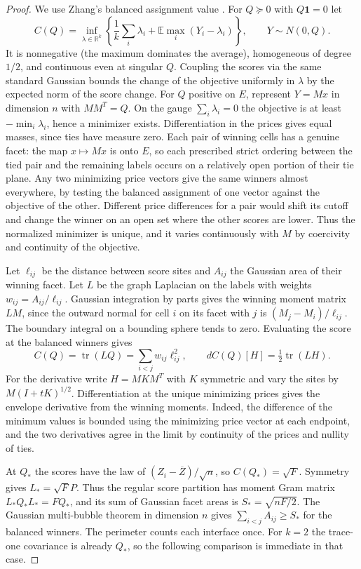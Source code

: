 \documentclass[11pt,reqno]{amsart}
\newcommand{\R}{\mathbb R}
\newcommand{\E}{\mathbb E}
\newcommand{\one}{\mathbf 1}
\DeclareMathOperator{\tr}{tr}
\begin{document}
\begin{proof}
We use Zhang's balanced assignment value \cite[Sections~2--5]{Zhang}.
For $Q\succeq0$ with $Q\one=0$ let
\[
 C(Q)=\inf_{\lambda\in\R^k}
 \left\{\frac{1}{k}\sum_i\lambda_i+
                      \E\max_i(Y_i-\lambda_i)\right\},\qquad
 Y\sim N(0,Q).
\]
It is nonnegative (the maximum dominates the average), homogeneous
of degree $1/2$, and continuous even at singular
$Q$. Coupling the scores via the same standard Gaussian bounds the
change of the objective uniformly in $\lambda$ by the expected norm
of the score change. For $Q$ positive on $E$, represent $Y=Mx$ in
dimension $n$ with $MM^T=Q$. On the gauge $\sum_i\lambda_i=0$ the
objective is at least $-\min_i\lambda_i$, hence a minimizer exists.
Differentiation in the prices gives equal masses, since ties have
measure zero. Each pair of winning cells has a genuine facet:
the map $x\mapsto Mx$ is onto $E$, so each prescribed strict ordering
between the tied pair and the remaining labels occurs on a relatively
open portion of their tie plane. Any two minimizing price vectors
give the same winners almost everywhere, by testing the balanced
assignment of one vector against the objective of the other. Different
price differences for a pair would shift its cutoff and change the
winner on an open set where the other scores are lower. Thus the
normalized minimizer is unique, and it varies continuously with $M$
by coercivity and continuity of the objective.

Let $\ell_{ij}$ be the distance between score sites and $A_{ij}$ the
Gaussian area of their winning facet. Let $L$ be the graph Laplacian
on the labels with weights $w_{ij}=A_{ij}/\ell_{ij}$. Gaussian
integration by parts gives the winning moment matrix $LM$, since the
outward normal for cell $i$ on its facet with $j$ is
$(M_j-M_i)/\ell_{ij}$. The boundary integral on a bounding sphere
tends to zero. Evaluating the score at the balanced winners gives
\[
 C(Q)=\tr(LQ)=\sum_{i<j}w_{ij}\ell_{ij}^2,\qquad
 dC(Q)[H]=\tfrac12\tr(LH).
\]
For the derivative write $H=MKM^T$ with $K$ symmetric and vary the
sites by $M(I+tK)^{1/2}$. Differentiation at the unique minimizing
prices gives the envelope derivative from the winning moments.
Indeed, the difference of the minimum values is bounded using the
minimizing price vector at each endpoint, and the two derivatives
agree in the limit by continuity of the prices and nullity of ties.

At $Q_*$ the scores have the law of
$(Z_i-\overline Z)/\sqrt n$, so $C(Q_*)=\sqrt F$.
Symmetry gives $L_*=\sqrt F P$. Thus the regular score partition has
moment Gram matrix $L_*Q_*L_*=FQ_*$, and its sum of Gaussian facet
areas is $S_*=\sqrt{nF/2}$. The Gaussian multi-bubble theorem
\cite[Theorem~1.1]{MN} in dimension $n$ gives
$\sum_{i<j}A_{ij}\ge S_*$ for the balanced winners. The perimeter counts
each interface once. For $k=2$ the trace-one covariance is already
$Q_*$, so the following comparison is immediate in that case.


\end{proof}
\end{document}
